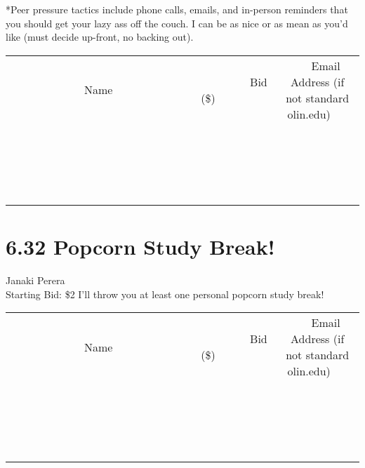 \documentclass[11pt]{article}
\begin{document}
*Peer pressure tactics include phone calls, emails, and in-person reminders that you should get your lazy ass off the couch. I can be as nice or as mean as you'd like (must decide up-front, no backing out).
\\[3ex]
\begin{tabular}{c c c}
~~~~~~~~~~~~~Name~~~~~~~~~~~~~ & ~~~~~~~~~Bid (\$)~~~~~~~~~  & ~~~Email Address (if not standard olin.edu)~~~\\
 & & \\
\hline
 & & \\
\hline
 & & \\
\hline
 & & \\
\hline
 & & \\
\hline
 & & \\
\hline
 & & \\
\hline
 & & \\
\hline
 & & \\
\hline
 & & \\
\hline
 & & \\
\hline
 & & \\
\hline
 & & \\
\hline
 & & \\
\hline
 & & \\
\hline
 & & \\
\hline
 & & \\
\hline
 & & \\
\hline
 & & \\
\hline
\end{tabular}
\newpage
\section*{6.32 Popcorn Study Break!}
Janaki Perera
\\
Starting Bid: \$2
\newline
I'll throw you at least one personal popcorn study break!
\\[3ex]
\begin{tabular}{c c c}
~~~~~~~~~~~~~Name~~~~~~~~~~~~~ & ~~~~~~~~~Bid (\$)~~~~~~~~~  & ~~~Email Address (if not standard olin.edu)~~~\\
 & & \\
\hline
 & & \\
\hline
 & & \\
\hline
 & & \\
\hline
 & & \\
\hline
 & & \\
\hline
 & & \\
\hline
 & & \\
\hline
 & & \\
\hline
 & & \\
\hline
 & & \\
\hline
 & & \\
\hline
 & & \\
\hline
 & & \\
\hline
 & & \\
\hline
 & & \\
\hline
 & & \\
\hline
 & & \\
\hline
 & & \\
\hline
\end{tabular}
\newpage
\end{document}
